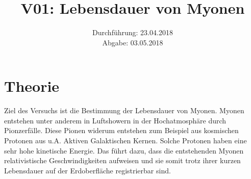 \documentclass[
  bibliography=totoc,     %
  captions=tableheading,  %
  titlepage=firstiscover, %
]{scrartcl}
\title{V01: Lebensdauer von Myonen}
\author{
  Simon Schulte
  \texorpdfstring{
    \\
    \href{mailto:simon.schulte@udo.edu}{simon.schulte@udo.edu}
  }{}
  \texorpdfstring{\and}{, }
  Tim Sedlaczek
  \texorpdfstring{
    \\
    \href{mailto:tim.sedlaczek@udo.edu}{tim.sedlaczek@udo.edu}
  }{}
}
\date{Durchführung: 23.04.2018\\
      Abgabe: 03.05.2018}
\begin{document}
\maketitle
\thispagestyle{empty}
\setcounter{page}{1}
\section{Theorie}
\label{sec:theorie}
  Ziel des Versuchs ist die Bestimmung der Lebensdauer von Myonen. Myonen
  entstehen unter anderem in Luftshowern in der Hochatmosphäre durch
  Pionzerfälle. Diese Pionen widerum entstehen zum Beispiel aus kosmischen
  Protonen aus u.A. Aktiven Galaktischen Kernen. Solche Protonen haben eine sehr
  hohe kinetische Energie. Das führt dazu, dass die entstehenden Myonen
  relativistische Geschwindigkeiten aufweisen und sie somit trotz ihrer kurzen
  Lebensdauer auf der Erdoberfläche registrierbar sind.
\end{document}
